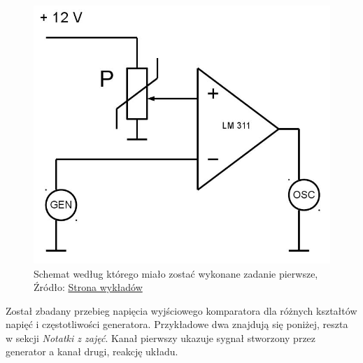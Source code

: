 \documentclass{article}
\begin{document}
\begin{figure}[!ht]
\begin{minipage}{.5\textwidth}
            \includegraphics[scale=0.35]{grafiki/schemat_komparator.jpg}
            \caption{Schemat według którego miało zostać wykonane zadanie pierwsze,
            \\Źródło: \href{https://spe.if.uj.edu.pl/instrukcje}{Strona wykładów}}
          \end{minipage}
        \end{figure}
        Został zbadany przebieg napięcia wyjściowego komparatora dla różnych 
        kształtów napięć i częstotliwości generatora. Przykładowe dwa znajdują się poniżej, reszta w sekcji \textit{Notatki z zajęć}. Kanał pierwszy ukazuje sygnał stworzony przez generator a kanał drugi, reakcję układu.
        \pagebreak
\end{document}
